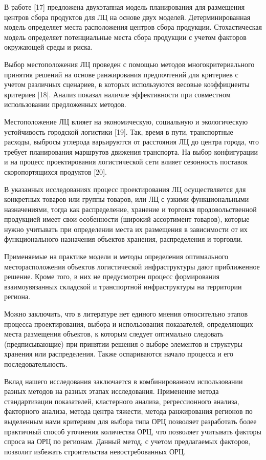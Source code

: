 В работе {[}17{]} предложена двухэтапная модель планирования для
размещения центров сбора продуктов для ЛЦ на основе двух моделей.
Детерминированная модель определяет места расположения центров сбора
продукции. Стохастическая модель определяет потенциальные места сбора
продукции с учетом факторов окружающей среды и риска.

Выбор местоположения ЛЦ проведен с помощью методов многокритериального
принятия решений на основе ранжирования предпочтений для критериев с
учетом различных сценариев, в которых используются весовые коэффициенты
критериев {[}18{]}. Анализ показал наличие эффективности при совместном
использовании предложенных методов.

Местоположение ЛЦ влияет на экономическую, социальную и экологическую
устойчивость городской логистики {[}19{]}. Так, время в пути,
транспортные расходы, выбросы углерода варьируются от расстояния ЛЦ до
центра города, что требует планирования маршрутов движения транспорта.
На выбор конфигурации и на процесс проектирования логистической сети
влияет сезонность поставок скоропортящихся продуктов {[}20{]}.

В указанных исследованиях процесс проектирования ЛЦ осуществляется для
конкретных товаров или группы товаров, или ЛЦ с узкими функциональными
назначениями, тогда как распределение, хранение и торговля
продовольственной продукцией имеет свои особенности (широкий ассортимент
товаров), которые нужно учитывать при определении места их размещения в
зависимости от их функционального назначения объектов хранения,
распределения и торговли.

Применяемые на практике модели и методы определения оптимального
месторасположения объектов логистической инфраструктуры дают
приближенное решение. Кроме того, в них не предусмотрен процесс
формирования взаимоувязанных складской и транспортной инфраструктуры на
территории региона.

Можно заключить, что в литературе нет единого мнения относительно этапов
процесса проектирования, выбора и использования показателей,
определяющих места размещения объектов, к которым следует оптимально
следовать (предписывающие) при принятии решения о выборе элементов и
структуры хранения или распределения. Также оспариваются начало процесса
и его последовательность.

Вклад нашего исследования заключается в комбинированном использовании
разных методов на разных этапах исследования. Применение метода
стандартизации показателей, кластерного анализа, регрессионного анализа,
факторного анализа, метода центра тяжести, метода ранжирования регионов
по выделенным нами критериям для выбора типа ОРЦ позволяет разработать
более практичный способ уточнения количества ОРЦ, что позволяет
учитывать факторы спроса на ОРЦ по регионам. Данный метод, с учетом
предлагаемых факторов, позволит избежать строительства невостребованных
ОРЦ.

